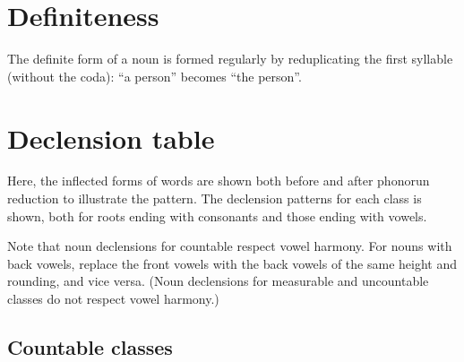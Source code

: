 \documentclass{book}
\begin{document}
\section{Definiteness}

The definite form of a noun is formed regularly by reduplicating the first syllable (without the coda):  ``a person'' becomes  ``the person''.

\section{Declension table}

Here, the inflected forms of words are shown both before and after phonorun reduction to illustrate the pattern. The declension patterns for each class is shown, both for roots ending with consonants and those ending with vowels.

Note that noun declensions for countable respect vowel harmony. For nouns with back vowels, replace the front vowels with the back vowels of the same height and rounding, and vice versa. (Noun declensions for measurable and uncountable classes do not respect vowel harmony.)

\subsection{Countable classes}
\end{document}
